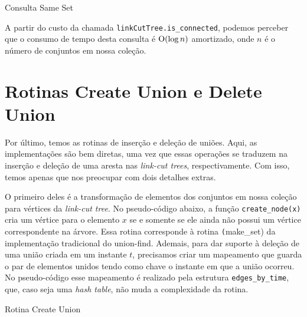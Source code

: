 \begin{algorithm}[h!]
    \caption{Consulta Same Set}\label{uf:same-set}
    \begin{algorithmic}[1]
        \State {}
        \EndIf
        \State {}
        \EndFunction
    \end{algorithmic}
\end{algorithm}

A partir do custo da chamada \texttt{linkCutTree.is\_connected}, podemos perceber que o consumo de tempo desta consulta é $\mathrm{O}(\log n)$ amortizado, onde $n$ é o número de conjuntos em nossa coleção.

\section{Rotinas Create Union e Delete Union}
\label{sec:uf-union}

Por último, temos as rotinas de inserção e deleção de uniões. Aqui, as implementações são bem diretas, uma vez que essas operações se traduzem na inserção e deleção de uma aresta nas \emph{link-cut trees}, respectivamente. Com isso, temos apenas que nos preocupar com dois detalhes extras.

O primeiro deles é a transformação de elementos dos conjuntos em nossa coleção para vértices da \emph{link-cut tree}. No pseudo-código abaixo, a função \texttt{create\_node(x)} cria um vértice para o elemento $x$ se e somente se ele ainda não possui um vértice correspondente na árvore. Essa rotina corresponde à rotina \texttt(make\_set) da implementação tradicional do union-find. Ademais, para dar suporte à deleção de uma união criada em um instante $t$, precisamos criar um mapeamento que guarda o par de elementos unidos tendo como chave o instante em que a união ocorreu. No pseudo-código esse mapeamento é realizado pela estrutura \texttt{edges\_by\_time}, que, caso seja uma \emph{hash table}, não muda a complexidade da rotina.

\begin{algorithm}[h!]
    \caption{Rotina Create Union}\label{uf:create-union}
    \begin{algorithmic}[1]
        \EndFunction
    \end{algorithmic}
\end{algorithm}


